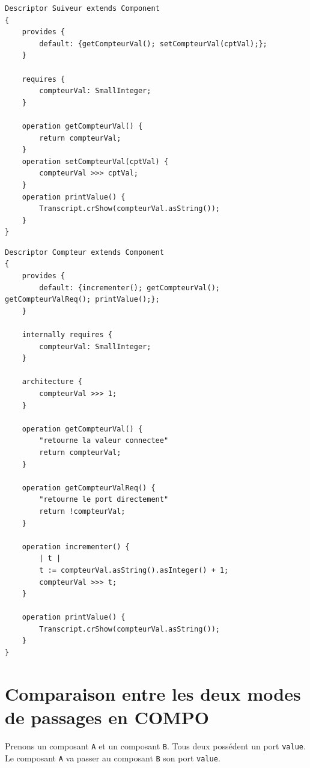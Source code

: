 \documentclass[11pt,a4paper,openany,oneside]{book}
\begin{document}
\begin{appendices}
\begin{lstlisting}[language=Compo, frame=single, caption=Programme Suiveur]
Descriptor Suiveur extends Component
{
	provides {
		default: {getCompteurVal(); setCompteurVal(cptVal);};
	}
	
	requires {
		compteurVal: SmallInteger;
	}
	
	operation getCompteurVal() {
		return compteurVal;
	}
	operation setCompteurVal(cptVal) {
		compteurVal >>> cptVal;
	}
	operation printValue() {
	    Transcript.crShow(compteurVal.asString());
	}
}
\end{lstlisting}

\begin{lstlisting}[language=Compo, frame=single, caption=Programme Compteur]
Descriptor Compteur extends Component
{
	provides {
		default: {incrementer(); getCompteurVal(); getCompteurValReq(); printValue();};
	}
	
	internally requires {
		compteurVal: SmallInteger;
	}
	
	architecture {
	    compteurVal >>> 1;
	}
	
	operation getCompteurVal() {
	    "retourne la valeur connectee"
		return compteurVal;
	}
	
	operation getCompteurValReq() {
	    "retourne le port directement"
		return !compteurVal;
	}
	
	operation incrementer() {
	    | t |
	    t := compteurVal.asString().asInteger() + 1;
	    compteurVal >>> t;
	}
	
	operation printValue() {
	    Transcript.crShow(compteurVal.asString());
	}
}
\end{lstlisting}


\chapter{Comparaison entre les deux modes de passages en COMPO}
\label{passagereqprovider}

Prenons un composant \texttt{A} et un composant \texttt{B}. Tous deux possédent un port \texttt{value}. Le composant \texttt{A} va passer au composant \texttt{B} son port \texttt{value}.


\end{appendices}
\end{document}
